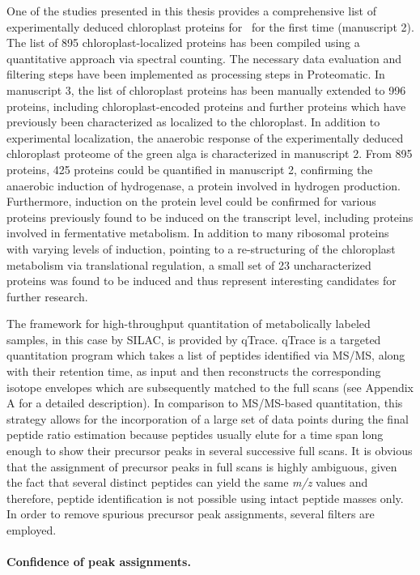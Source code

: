 One of the studies presented in this thesis provides a comprehensive list of 
experimentally deduced chloroplast proteins for \cre~for the first time
(manuscript 2).
The list of 895 chloroplast-localized proteins has been compiled using
a quantitative approach via spectral counting.
The necessary data evaluation and filtering steps have been implemented
as processing steps in Proteomatic.
In manuscript 3, the list of chloroplast proteins has been manually extended 
to 996 proteins, including chloroplast-encoded proteins and further proteins
which have previously been characterized as localized to the chloroplast.
In addition to experimental localization, the anaerobic response of the 
experimentally deduced chloroplast proteome of the green alga is characterized 
in manuscript 2. 
From 895 proteins, 425 proteins could be quantified in manuscript 2, 
confirming the anaerobic induction of hydrogenase, a protein involved in 
hydrogen production.
Furthermore, induction on the protein level could be confirmed for various 
proteins previously found to be induced on the transcript level,
including proteins involved in fermentative metabolism.
In addition to many ribosomal proteins with varying levels of induction,
pointing to a re-structuring of the chloroplast metabolism via translational 
regulation, a small set of 23 uncharacterized proteins was found to be induced
and thus represent interesting candidates for further research.

The framework for high-throughput quantitation of metabolically labeled 
samples, in this case by SILAC, is provided by qTrace.
qTrace is a targeted quantitation program which takes a list of peptides
identified via MS/MS, along with their retention time, as input and then 
reconstructs the corresponding isotope envelopes which are subsequently 
matched to the full scans (see Appendix A for a detailed description).
In comparison to MS/MS-based quantitation, this strategy allows for the
incorporation of a large set of data points during the final peptide ratio
estimation because peptides usually elute for a time span long enough to
show their precursor peaks in several successive full scans.
It is obvious that the assignment of precursor peaks in full scans is highly
ambiguous, given the fact that several distinct peptides can yield the
same {\em m/z} values and therefore, peptide identification is not possible
using intact peptide masses only.
In order to remove spurious precursor peak assignments, several filters are 
employed.

\paragraph{Confidence of peak assignments.}

